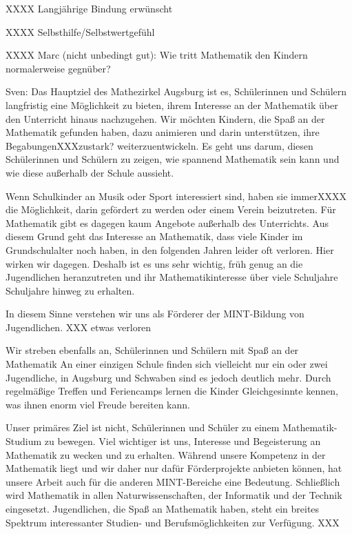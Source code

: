 \documentclass[12pt]{zettel}
\begin{document}
XXXX Langjährige Bindung erwünscht

XXXX Selbsthilfe/Selbstwertgefühl

XXXX Marc (nicht unbedingt gut): Wie tritt Mathematik den Kindern normalerweise gegnüber?

\begin{small}
Sven:
Das Hauptziel des Mathezirkel Augsburg ist es, Schülerinnen und Schülern
langfristig eine Möglichkeit zu bieten, ihrem Interesse an der
Mathematik über den Unterricht hinaus nachzugehen. Wir möchten Kindern, die Spaß an der
Mathematik gefunden haben, dazu animieren und darin unterstützen, ihre
BegabungenXXXzustark? weiterzuentwickeln.
Es geht uns darum, diesen Schülerinnen und
Schülern zu zeigen, wie spannend Mathematik sein kann und wie diese außerhalb der Schule aussieht.

Wenn Schulkinder an Musik oder Sport interessiert sind, haben sie immerXXXX die
Möglichkeit, darin gefördert zu werden oder einem Verein beizutreten. Für
Mathematik gibt es dagegen kaum Angebote außerhalb des Unterrichts. Aus diesem
Grund geht das Interesse an Mathematik, dass viele Kinder im Grundschulalter
noch haben, in den folgenden Jahren leider oft verloren. Hier wirken wir
dagegen. Deshalb ist es uns sehr wichtig, früh genug an die Jugendlichen
heranzutreten und ihr Mathematikinteresse über viele Schuljahre
Schuljahre hinweg zu erhalten.

In diesem Sinne verstehen wir uns als Förderer der MINT-Bildung von
Jugendlichen. XXX etwas verloren

Wir streben ebenfalls an, Schülerinnen und Schülern mit Spaß an der Mathematik
An einer einzigen Schule finden sich vielleicht
nur ein oder zwei Jugendliche, in Augsburg und Schwaben sind es jedoch
deutlich mehr. Durch regelmäßige Treffen und Feriencamps lernen die
Kinder Gleichgesinnte kennen, was ihnen enorm viel Freude bereiten kann.

Unser primäres Ziel ist nicht, Schülerinnen und Schüler zu einem
Mathematik-Studium zu bewegen. Viel wichtiger ist uns, Interesse und
Begeisterung an Mathematik zu wecken und zu erhalten. Während unsere Kompetenz
in der Mathematik liegt und wir daher nur dafür Förderprojekte anbieten können,
hat unsere Arbeit auch für die anderen MINT-Bereiche eine Bedeutung.
Schließlich wird Mathematik in allen Naturwissenschaften, der Informatik und
der Technik eingesetzt. Jugendlichen, die Spaß an Mathematik haben, steht ein
breites Spektrum interessanter Studien- und Berufsmöglichkeiten zur Verfügung.
XXX
\end{small}
\end{document}
